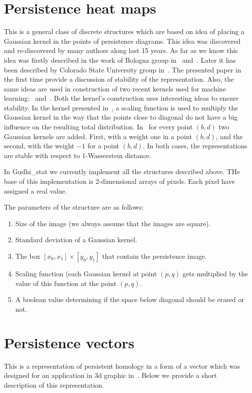 \documentclass[11pt]{article}
\begin{document}
\section{Persistence heat maps}
This is a general class of discrete structures which are based on idea of placing a Gaussian kernel in the points of persistence diagrams. This idea was discovered and re-discovered by many authors along last 15 years. As far as we know this idea was firstly described in the work of Bologna group in~\cite{bologna1} and~\cite{bologna2}. Later it has been described by Colorado State University group in~\cite{henry}. The presented paper in the first time provide a discussion of stability of the representation. Also, the same ideas are used in construction of two recent kernels used for machine learning:~\cite{yasu} and~\cite{uli}. Both the kernel's construction uses interesting ideas to ensure stability. In the kernel presented in~\cite{yasu}, a scaling function is used to multiply the Gaussian kernel in the way that the points close to diagonal do not have a big influence on the resulting total distribution. In~\cite{uli} for every point $(b,d)$ two Gaussian kernels are added. First, with a weight one in a point $(b,d)$, and the second, with the weight $-1$ for a point $(b,d)$. In both cases, the representations are stable with respect to 1-Wasserstein distance.

In Gudhi\_stat we currently implement all the structures described above. THe base of this implementation is 2-dimensional arrays of pixels. Each pixel have assigned a real value. 

The parameters of the structure are as follows:
\begin{enumerate}
\item Size of the image (we always assume that the images are square).
\item Standard deviation of a Gaussian kernel.
\item The box $[x_0,x_1]\times [y_0,y_1]$ that contain the persistence image. 
\item Scaling function (each Gaussian kernel at point $(p,q)$ gets multiplied by the value of this function at the point $(p,q)$. 
\item A boolean value determining if the space below diagonal should be erased or not. 
\end{enumerate}

\section{Persistence vectors}
This is a representation of persistent homology in a form of a vector which was designed for an application in 3d graphic in~\cite{vectors}. Below we provide a short description of this representation.
\end{document}
